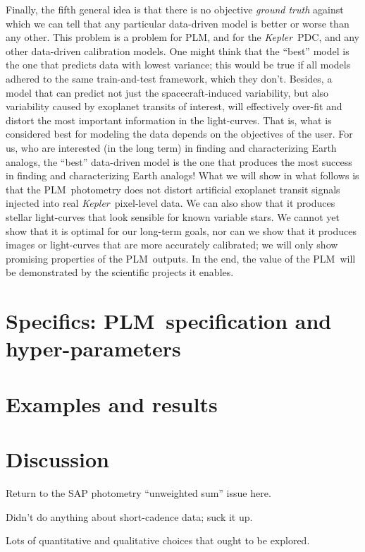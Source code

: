 \documentclass[12pt, preprint]{aastex}
\newcommand{\project}[1]{\textsl{#1}}
\newcommand{\Kepler}{\project{Kepler}}
\newcommand{\name}{PLM}
\begin{document}
Finally, the fifth general idea is that there is no objective \emph{ground truth} against which we can tell
  that any particular data-driven model is better or worse than any other.
This problem is a problem for \name, and for the \Kepler\ PDC, and any other data-driven calibration models.
One might think that the ``best'' model is the one that predicts data with lowest variance;
  this would be true if all models adhered to the same train-and-test framework, which they don't.
Besides, a model that can predict not just the spacecraft-induced variability,
  but also variability caused by exoplanet transits of interest,
  will effectively over-fit and distort the most important information in the light-curves.
That is, what is considered best for modeling the data depends on the objectives of the user.
For us, who are interested (in the long term) in finding and characterizing Earth analogs,
  the ``best'' data-driven model is the one that produces the most success in finding and characterizing Earth analogs!
What we will show in what follows is that the \name\ photometry does not distort
  artificial exoplanet transit signals injected into real \Kepler\ pixel-level data.
We can also show that it produces stellar light-curves that look sensible for known variable stars.
We cannot yet show that it is optimal for our long-term goals,
  nor can we show that it produces images or light-curves that are more accurately calibrated;
  we will only show promising properties of the \name\ outputs.
In the end, the value of the \name\ will be demonstrated by the scientific projects it enables.

\section{Specifics: \name\ specification and hyper-parameters}

\section{Examples and results}

\section{Discussion}

Return to the SAP photometry ``unweighted sum'' issue here.

Didn't do anything about short-cadence data; suck it up.

Lots of quantitative and qualitative choices that ought to be explored.
\end{document}
